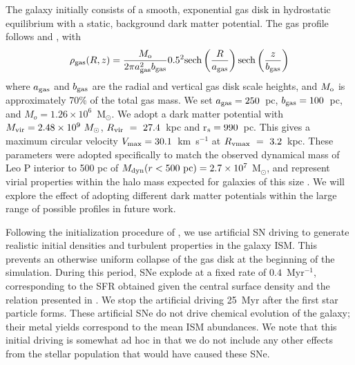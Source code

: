 \documentclass[twocolumn]{aastex61}
\begin{document}
The galaxy initially consists of a smooth, exponential gas disk in hydrostatic equilibrium with a static, background dark matter potential. The gas profile follows \citet{Tonnesen2009} and \citet{Salem2015}, with
\begin{equation}
\rho_{\rm gas} (R,z) = \frac{M_{\rm o}}{2\pi a^2_{\rm gas}b_{\rm gas}} 0.5^2{\rm sech}\left(\frac{R}{a_{\rm gas}}\right){\rm sech}\left(\frac{z}{b_{\rm gas}}\right)
\end{equation}
where $a_{\rm gas}$ and $b_{\rm gas}$ are the radial and vertical gas disk scale heights, and $M_{\rm o}$ is approximately 70\% of the total gas mass. We set $a_{\rm gas} = 250$~pc, $b_{\rm gas} = 100$~pc, and $M_o = 1.26\times 10^6$~M$_{\odot}$. We adopt a \citet{Burkert1995} dark matter potential with $M_{\rm vir} = 2.48\times 10^{9}~M_{\odot}$, $R_{\rm vir}~=~27.4$~kpc and r$_{\rm s} = 990$~pc. This gives a maximum circular velocity $V_{\rm max} = 30.1$~km~s$^{-1}$ at $R_{\rm vmax}~=~3.2$~kpc. These parameters were adopted specifically to match the observed dynamical mass of Leo P interior to 500 pc of $M_{\rm dyn} (r < 500~\rm{pc}) = 2.7\times 10^{7}$ M$_{\odot}$, and represent virial properties within the halo mass expected for galaxies of this size \citep{Ferrero2012,Read2017}. We will explore the effect of adopting different dark matter potentials within the large range of possible profiles in future work.

Following the initialization procedure of \citet{Hu2017}, we use artificial SN driving to generate realistic initial densities and turbulent properties in the galaxy ISM. This prevents an otherwise uniform collapse of the gas disk at the beginning of the simulation. During this period, SNe explode at a fixed rate of $0.4$~Myr$^{-1}$, corresponding to the SFR obtained given the central  surface density and the relation presented in \citep{Roychowdhury2009}. We stop the artificial driving 25~Myr after the first star particle forms. These artificial SNe do not drive chemical evolution of the galaxy; their metal yields correspond to the mean ISM abundances. We note that this initial driving is somewhat ad hoc in that we do not include any other effects from the stellar population that would have caused these SNe.
\end{document}
